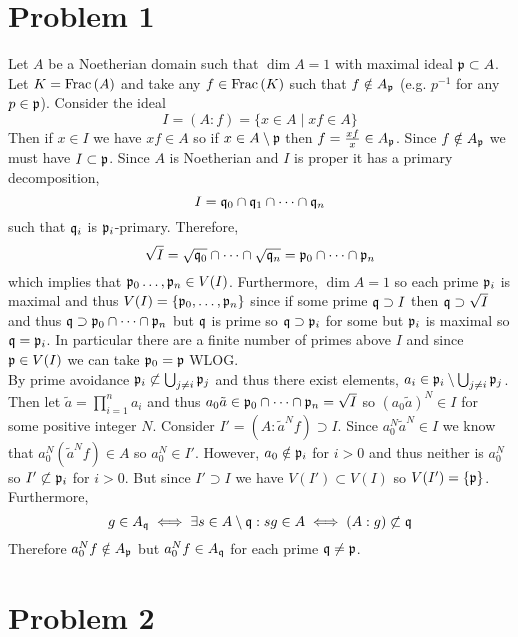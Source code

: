 \documentclass[12pt]{article}
\begin{document}
\renewcommand{\ev}[1]{\mathrm{ev}_{#1}}
\renewcommand{\tr}{\mathrm{tr}}
\renewcommand{\det}{\mathrm{det}}
\newcommand{\Endover}[2]{\mathrm{End}_{#1}\left(#2\right)}

\section{Problem 1}

Let $A$ be a Noetherian domain such that $\dim{A} = 1$ with maximal ideal $\mathfrak{p} \subset A$. Let $K = \mathrm{Frac}\left(A\right)$ and take any $f \in \mathrm{Frac}\left(K\right)$ such that $f \notin A_{\mathfrak{p}}$ (e.g. $p^{-1}$ for any $p \in \mathfrak{p}$). Consider the ideal
\[ I = (A : f) = \{ x \in A \mid x f \in A \} \]
Then if $x \in I$ we have $x f \in A$ so if $x \in A \setminus \mathfrak{p}$ then $f = \frac{xf}{x} \in A_{\mathfrak{p}}$. Since $f \notin A_{\mathfrak{p}}$ we must have $I \subset \mathfrak{p}$. Since $A$ is Noetherian and $I$ is proper it has a primary decomposition,
\[ I = \mathfrak{q}_0 \cap \mathfrak{q}_1 \cap \cdots \cap \mathfrak{q}_n \]
such that $\mathfrak{q}_i$ is $\mathfrak{p}_i$-primary. Therefore,
\[ \sqrt{I} = \sqrt{\mathfrak{q}_0} \cap \cdots \cap \sqrt{\mathfrak{q}_n} = \mathfrak{p}_0 \cap \cdots \cap \mathfrak{p}_n \]
which implies that $\mathfrak{p}_0 \dots, \mathfrak{p}_n \in V(I)$. Furthermore, $\dim{A} = 1$ so each prime $\mathfrak{p}_i$ is maximal and thus $V(I) = \{\mathfrak{p}_0, \dots, \mathfrak{p}_n \}$ since if some prime $\mathfrak{q} \supset I$ then $\mathfrak{q} \supset \sqrt{I}$ and thus $\mathfrak{q} \supset \mathfrak{p}_0 \cap \cdots \cap \mathfrak{p}_n$ but $\mathfrak{q}$ is prime so $\mathfrak{q} \supset \mathfrak{p}_i$ for some but $\mathfrak{p}_i$ is maximal so $\mathfrak{q} = \mathfrak{p}_i$. In particular there are a finite number of primes above $I$ and since $\mathfrak{p} \in V(I)$ we can take $\mathfrak{p}_0 = \mathfrak{p}$ WLOG. 
\bigskip\\
By prime avoidance $\mathfrak{p}_i \not\subset \bigcup_{j \neq i} \mathfrak{p}_j$ and thus there exist elements, $a_i \in \mathfrak{p}_i \setminus \bigcup_{j \neq i} \mathfrak{p}_j$. Then let $\tilde{a} = \prod_{i = 1}^n a_i$ and thus $a_0 \tilde{a} \in \mathfrak{p}_0 \cap \cdots \cap \mathfrak{p}_n = \sqrt{I}$ so $(a_0 \tilde{a})^N \in I$ for some positive integer $N$. Consider $I' = (A : \tilde{a}^N f) \supset I$. Since $a_0^N \tilde{a}^N \in I$ we know that $a_0^N (\tilde{a}^N f) \in A$ so $a_0^N \in I'$. However, $a_0 \notin \mathfrak{p}_i$ for $i > 0$ and thus neither is $a_0^N$ so $I' \not\subset \mathfrak{p}_i$ for $i > 0$. But since $I' \supset I$ we have $V(I') \subset V(I)$ so $V(I') = \{ \mathfrak{p} \}$. Furthermore, 
\[ g \in A_{\mathfrak{q}} \iff \exists s \in A \setminus \mathfrak{q} : s g \in A \iff (A : g) \not\subset \mathfrak{q} \] 
Therefore $a_0^N f \notin A_{\mathfrak{p}}$ but $a_0^N f \in A_{\mathfrak{q}}$ for each prime $\mathfrak{q} \neq \mathfrak{p}$.  

\section{Problem 2}
\end{document}

